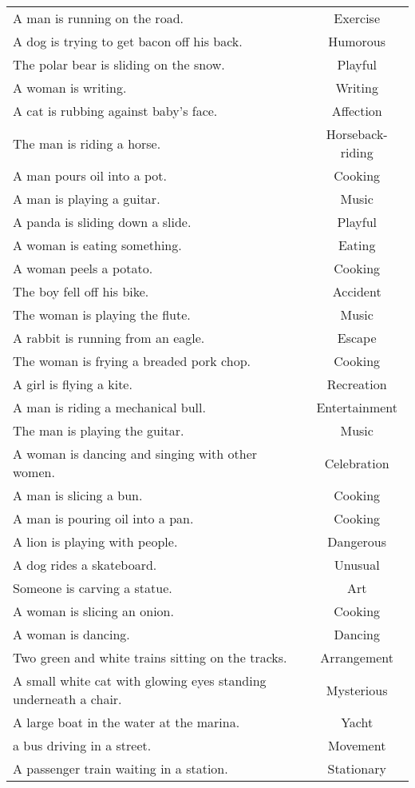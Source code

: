 \documentclass{article}
\begin{document}
\begin{longtable}{p{12cm}c}
A man is running on the road. & Exercise\\
A dog is trying to get bacon off his back. & Humorous\\
The polar bear is sliding on the snow. & Playful\\
A woman is writing. & Writing\\
A cat is rubbing against baby's face. & Affection\\
The man is riding a horse. & Horseback-riding\\
A man pours oil into a pot. & Cooking\\
A man is playing a guitar. & Music\\
A panda is sliding down a slide. & Playful\\
A woman is eating something. & Eating\\
A woman peels a potato. & Cooking\\
The boy fell off his bike. & Accident\\
The woman is playing the flute. & Music\\
A rabbit is running from an eagle. & Escape\\
The woman is frying a breaded pork chop. & Cooking\\
A girl is flying a kite. & Recreation\\
A man is riding a mechanical bull. & Entertainment\\
The man is playing the guitar. & Music\\
A woman is dancing and singing with other women. & Celebration\\
A man is slicing a bun. & Cooking\\
A man is pouring oil into a pan. & Cooking\\
A lion is playing with people. & Dangerous\\
A dog rides a skateboard. & Unusual\\
Someone is carving a statue. & Art\\
A woman is slicing an onion. & Cooking\\
A woman is dancing. & Dancing\\
Two green and white trains sitting on the tracks. & Arrangement\\
A small white cat with glowing eyes standing underneath a chair. & Mysterious\\
A large boat in the water at the marina. & Yacht\\
a bus driving in a street. & Movement\\
A passenger train waiting in a station. & Stationary\\

\end{longtable}
\end{document}
